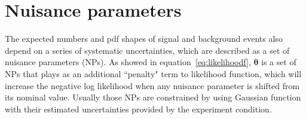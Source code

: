 \section{Nuisance parameters}
\label{sec:NPs}

The expected numbers and pdf shapes of signal and background events also depend on a series of systematic uncertainties, 
which are described as a set of nuisance parameters (NPs).
As showed in equation~\ref{eq:likelihoodf}, $\pmb{\theta}$ is a set of NPs that plays as an additional ``penalty" term to likelihood function, 
which will increase the negative log likelihood when any nuisance parameter is shifted from its nominal value.
Usually those NPs are constrained by using Gaussian function with their estimated uncertainties provided by the experiment condition.
